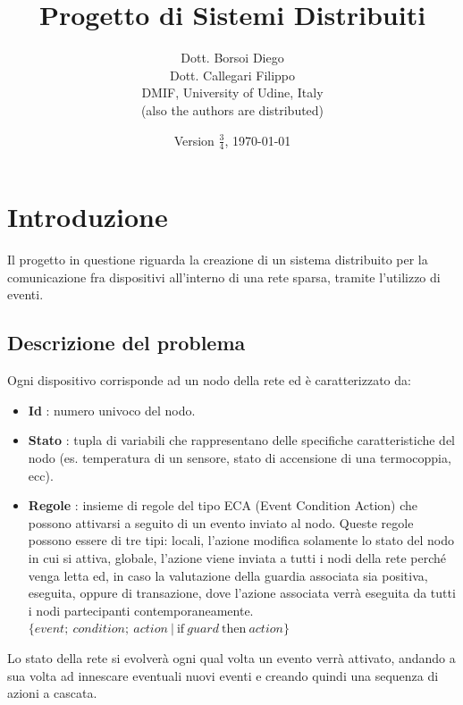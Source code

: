 \documentclass[italian]{memoir}
\title{Progetto di Sistemi Distribuiti}
\author{Dott. Borsoi Diego\\Dott. Callegari Filippo\\ DMIF, University of Udine,
	   Italy\\(also the authors are distributed)}
\date{Version $\frac{3}{4}$, \today}
\begin{document}
\maketitle
\newpage

\tableofcontents
\newpage



\chapter{Introduzione}\label{ch:intro}

Il progetto in questione riguarda la creazione di un sistema distribuito per la comunicazione
	   fra dispositivi all'interno di una rete sparsa, tramite l'utilizzo di eventi.

\section{Descrizione del problema}

Ogni dispositivo corrisponde ad un nodo della rete ed è caratterizzato da:
\begin{itemize}
\item \textbf{Id} : numero univoco del nodo.
\item \textbf{Stato} : tupla di variabili che rappresentano delle specifiche caratteristiche
	   del nodo (es. temperatura di un sensore, stato di accensione di una termocoppia,
	   ecc).
\item \textbf{Regole} : insieme di regole del tipo ECA (Event Condition Action) che
	   possono attivarsi a seguito di un evento inviato al nodo. Queste regole possono
	   essere
	   di tre tipi: locali, l'azione modifica solamente lo stato del nodo in cui si
	   attiva,
	   globale, l'azione viene inviata a tutti i nodi della rete perché venga
	   letta
	   ed, in caso la valutazione della guardia associata sia positiva, eseguita, oppure di transazione, dove l'azione associata verrà eseguita da tutti i nodi partecipanti contemporaneamente.
\center$\{event;~condition;~action~|~\text{if}~guard~\text{then}~action\}$
\end{itemize}

Lo stato della rete si evolverà ogni qual volta un evento verrà attivato, andando
	   a sua volta ad innescare eventuali nuovi eventi e creando quindi una sequenza
	   di
	   azioni a cascata.
\end{document}
